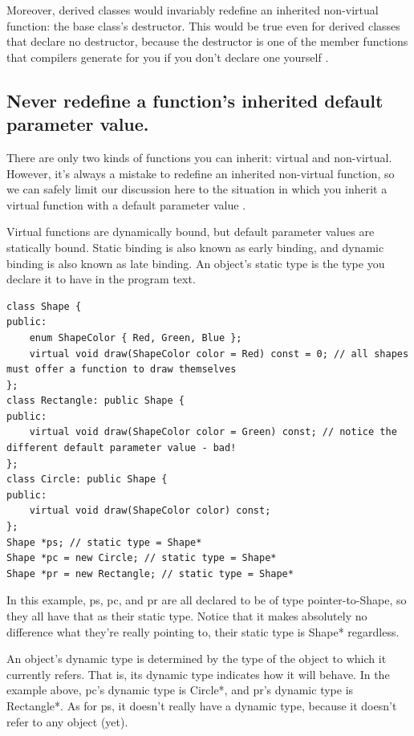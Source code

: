 \documentclass[a4paper,12pt,notitlepage]{article}
\begin{document}
Moreover, derived classes would invariably redefine an inherited non-virtual function: the base
class's destructor. This would be true even for derived classes that declare no destructor, because the destructor is one of the member functions that compilers generate for you if you don't declare one yourself \cite{Meyers_eff}.


\subsection{Never redefine a function's inherited default parameter value.}

There are only two kinds of functions you can inherit: virtual and non-virtual. However, it's always a mistake to redefine an inherited non-virtual function, so we can safely limit our discussion here to the situation in which you inherit a virtual function with a default parameter value \cite{Meyers_eff}.

Virtual functions are dynamically bound, but default parameter values are statically bound. Static binding is also known as early binding, and dynamic binding is also known as late binding. An object's static type is the type you declare it to have in the program text.

\begin{verbatim}
class Shape {
public:
    enum ShapeColor { Red, Green, Blue };
    virtual void draw(ShapeColor color = Red) const = 0; // all shapes must offer a function to draw themselves
};
class Rectangle: public Shape {
public:
    virtual void draw(ShapeColor color = Green) const; // notice the different default parameter value - bad!
};
class Circle: public Shape {
public:
    virtual void draw(ShapeColor color) const;
};
Shape *ps; // static type = Shape*
Shape *pc = new Circle; // static type = Shape*
Shape *pr = new Rectangle; // static type = Shape*
\end{verbatim}

In this example, ps, pc, and pr are all declared to be of type pointer-to-Shape, so they all have that as their static type. Notice that it makes absolutely no difference what they're really pointing to, their static type is Shape* regardless.

An object's dynamic type is determined by the type of the object to which it currently refers. That is, its dynamic type indicates how it will behave. In the example above, pc's dynamic type is Circle*, and pr's
dynamic type is Rectangle*. As for ps, it doesn't really have a dynamic type, because it doesn't refer to any object (yet).
\end{document}
